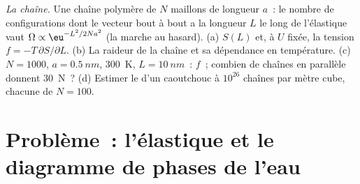 \begin{exercise}[$\star\star\star$]\label{exo:b2:thermodynamic-potentials:12}
\emph{La chaîne.} Une chaîne polymère de $N$ maillons de longueur $a$~: le
nombre de configurations dont le vecteur bout à bout a la longueur $L$ le long
de l'élastique vaut $\Omega \propto \eu^{-L^2/2Na^2}$ (la marche au hasard). (a) $S(L)$
et, à $U$ fixée, la tension $f = -T\,\partial S/\partial L$. (b) La
raideur de la chaîne et sa dépendance en température. (c) $N = 1000$, $a =
\qty{0.5}{nm}$, \qty{300}{K}, $L = \qty{10}{nm}$~: $f$~; combien de chaînes en
parallèle donnent \qty{30}{N}~? (d) Estimer le  d'un caoutchouc
à $10^{26}$ chaînes par mètre cube, chacune de $N = 100$.
\end{exercise}

\section{Problème~: l'élastique et le diagramme de phases de l'eau}

